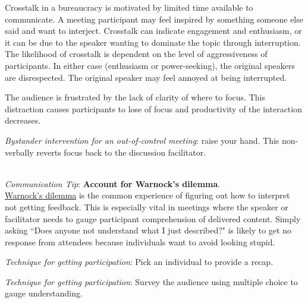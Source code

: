 Crosstalk in a bureaucracy is motivated by
limited time available to communicate. A meeting participant may feel inspired by something someone else said and want to interject. 
Crosstalk can indicate engagement and enthusiasm, or it can be due to the speaker wanting to dominate the topic through interruption. The likelihood of crosstalk is dependent on the level of aggressiveness of participants.
In either case (enthusiasm or power-seeking), the original speakers are disrespected. The original speaker may feel annoyed at being interrupted.



The audience is frustrated by the lack of clarity of where to focus. This distraction causes participants to lose of focus and productivity of the interaction decreases.

\textit{Bystander intervention for an out-of-control meeting}: raise your hand. 
This non-verbally reverts focus back to the discussion facilitator. 

\ \\
\textit{Communication Tip}: \textbf{Account for Warnock's dilemma}.\\
\href{https://en.wikipedia.org/wiki/Warnock\%27s_dilemma}{Warnock's dilemma}
is the common experience of figuring out how to interpret not getting feedback. This is especially vital in meetings where the speaker or facilitator needs to gauge participant comprehension of delivered content. Simply asking ``Does anyone not understand what I just described?" is likely to get no response from attendees because individuals want to avoid looking stupid.

\textit{Technique for getting participation}: Pick an individual to provide a recap.

\textit{Technique for getting participation}: Survey the audience using multiple choice to gauge understanding.

